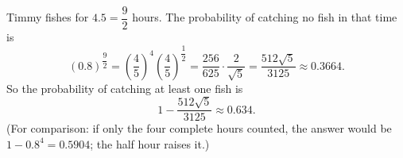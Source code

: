 Timmy fishes for $4.5=\dfrac{9}{2}$ hours. The probability of catching no fish in that time is
\[
(0.8)^{\dfrac{9}{2}}=\left(\dfrac{4}{5}\right)^{4}\left(\dfrac{4}{5}\right)^{\dfrac{1}{2}}=\dfrac{256}{625}\cdot\dfrac{2}{\sqrt5}=\dfrac{512\sqrt5}{3125}\approx0.3664 .
\]
So the probability of catching at least one fish is
\[
\boxed{1-\dfrac{512\sqrt5}{3125}}\approx0.634 .
\]
(For comparison: if only the four complete hours counted, the answer would be $1-0.8^4=0.5904$; the half hour raises it.)
